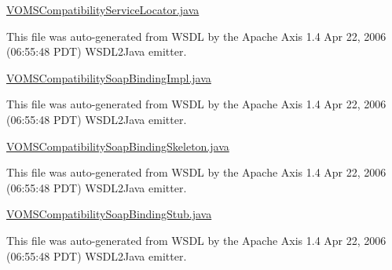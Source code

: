 \hyperlink{VOMSCompatibilityServiceLocator_8java}{VOMSCompatibilityServiceLocator.java}

This file was auto-\/generated from WSDL by the Apache Axis 1.4 Apr 22, 2006 (06:55:48 PDT) WSDL2Java emitter.

\hyperlink{VOMSCompatibilitySoapBindingImpl_8java}{VOMSCompatibilitySoapBindingImpl.java}

This file was auto-\/generated from WSDL by the Apache Axis 1.4 Apr 22, 2006 (06:55:48 PDT) WSDL2Java emitter.

\hyperlink{VOMSCompatibilitySoapBindingSkeleton_8java}{VOMSCompatibilitySoapBindingSkeleton.java}

This file was auto-\/generated from WSDL by the Apache Axis 1.4 Apr 22, 2006 (06:55:48 PDT) WSDL2Java emitter.

\hyperlink{VOMSCompatibilitySoapBindingStub_8java}{VOMSCompatibilitySoapBindingStub.java}

This file was auto-\/generated from WSDL by the Apache Axis 1.4 Apr 22, 2006 (06:55:48 PDT) WSDL2Java emitter. 